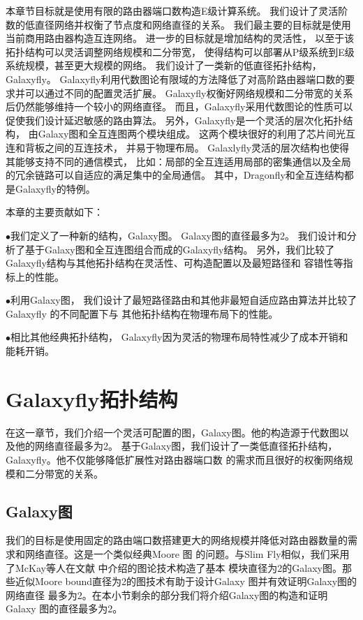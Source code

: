 本章节目标就是使用有限的路由器端口数构造E级计算系统。
我们设计了灵活阶数的低直径网络并权衡了节点度和网络直径的关系。
我们最主要的目标就是使用当前商用路由器构造互连网络。
进一步的目标就是增加结构的灵活性，
以至于该拓扑结构可以灵活调整网络规模和二分带宽，
使得结构可以部署从P级系统到E级系统规模，甚至更大规模的网络。
我们设计了一类新的低直径拓扑结构，Galaxyfly。
Galaxyfly利用代数图论有限域的方法降低了对高阶路由器端口数的要求并可以通过不同的配置灵活扩展。
Galaxyfly权衡好网络规模和二分带宽的关系后仍然能够维持一个较小的网络直径。
而且，Galaxyfly采用代数图论的性质可以促使我们设计延迟敏感的路由算法。
另外，Galaxyfly是一个灵活的层次化拓扑结构，
由Galaxy图和全互连图两个模块组成。
这两个模块很好的利用了芯片间光互连和背板之间的互连技术，
并易于物理布局。
Galaxlyfly灵活的层次结构也使得其能够支持不同的通信模式，
比如：局部的全互连适用局部的密集通信以及全局的冗余链路可以自适应的满足集中的全局通信。
其中，Dragonfly和全互连结构都是Galaxyfly的特例。

本章的主要贡献如下：

$\bullet$我们定义了一种新的结构，Galaxy图。
Galaxy图的直径最多为2。
我们设计和分析了基于Galaxy图和全互连图组合而成的Galaxyfly结构。
另外，我们比较了Galaxyfly结构与其他拓扑结构在灵活性、可构造配置以及最短路径和
容错性等指标上的性能。

$\bullet$利用Galaxy图，
我们设计了最短路径路由和其他非最短自适应路由算法并比较了Galaxyfly 的不同配置下与
其他拓扑结构在物理布局下的性能。

$\bullet$相比其他经典拓扑结构，
Galaxyfly因为灵活的物理布局特性减少了成本开销和能耗开销。

\section{Galaxyfly拓扑结构}

在这一章节，我们介绍一个灵活可配置的图，Galaxy图。他的构造源于代数图以及他的网络直径最多为2。
基于Galaxy图，我们设计了一类低直径拓扑结构，Galaxyfly。他不仅能够降低扩展性对路由器端口数
的需求而且很好的权衡网络规模和二分带宽的关系。

\subsection{Galaxy图}

我们的目标是使用固定的路由端口数搭建更大的网络规模并降低对路由器数量的需求和网络直径。这是一个类似经典Moore 图
的问题。与Slim Fly相似，我们采用了McKay等人在文献 中介绍的图论技术构造了基本
模块直径为2的Galaxy图。那些近似Moore bound直径为2的图技术有助于设计Galaxy 图并有效证明Galaxy图的网络直径
最多为2。在本小节剩余的部分我们将介绍Galaxy图的构造和证明Galaxy 图的直径最多为2。

